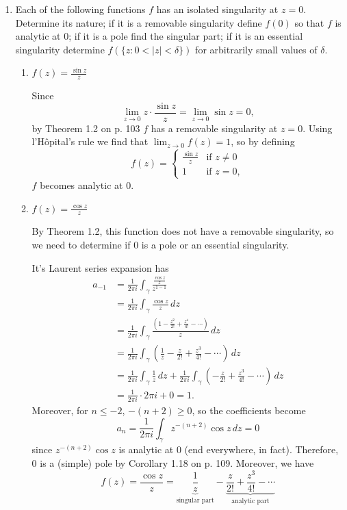 \documentclass[11pt,oneside,english]{amsart}
\theoremstyle{definition}
\newcommand{\lom}[2]{\lim_{{#1}\rightarrow{#2}}}
\begin{document}
\begin{enumerate}
\itemsep5mm

\item Each of the following functions $f$ has an isolated singularity at $z=0$. Determine its nature; if it is a removable singularity define $f(0)$ so that $f$ is analytic at 0; if it is a pole find the singular part; if it is an essential singularity determine $f(\{z:0<|z|<\delta\})$ for arbitrarily small values of $\delta$.

\begin{enumerate}
\itemsep5mm

\item $\displaystyle f(z)=\frac{\sin z}{z}$

Since 
\[
\lom{z}{0}z\cdot\frac{\sin z}{z}=\lom{z}{0}\sin z=0,
\]
by Theorem 1.2 on p. 103 $f$ has a removable singularity at $z=0$. Using l'H\^{o}pital's rule we find that $\lom{z}{0}f(z)=1$, so by defining
\[
f(z)=\begin{cases}\frac{\sin z}{z} & \text{if }z\neq0\\ 1 & \text{if }z=0,\end{cases}
\]
$f$ becomes analytic at 0.

\item $\displaystyle f(z)=\frac{\cos z}{z}$

By Theorem 1.2, this function does not have a removable singularity, so we need to determine if 0 is a pole or an essential singularity.

It's Laurent series expansion has
\begin{align*}
a_{-1}&=\frac{1}{2\pi i}\int_\gamma\frac{\frac{\cos z}{z}}{z^{1-1}}\\[2mm]
&=\frac{1}{2\pi i}\int_\gamma \frac{\cos z}{z}\,dz\\[2mm]
&=\frac{1}{2\pi i}\int_\gamma\frac{\left(1-\frac{z^2}{2!}+\frac{z^4}{4!}-\cdots\right)}{z}\,dz\\[2mm]
&=\frac{1}{2\pi i}\int_\gamma \left(\frac{1}{z}-\frac{z}{2!}+\frac{z^3}{4!}-\cdots\right)\,dz\\[2mm]
&=\frac{1}{2\pi i}\int_\gamma \frac{1}{z}\,dz+\frac{1}{2\pi i}\int_\gamma \left(-\frac{z}{2!}+\frac{z^3}{4!}-\cdots\right)\,dz\\[2mm]
&=\frac{1}{2\pi i}\cdot 2\pi i+0=1.
\end{align*}
Moreover, for $n\leq -2$, $-(n+2)\geq 0$, so the coefficients become
\[
a_{n}=\frac{1}{2\pi i}\int_\gamma z^{-(n+2)}\cos z\,dz=0
\]
since $z^{-(n+2)}\cos z$ is analytic at $0$ (end everywhere, in fact). Therefore, 0 is a (simple) pole by Corollary 1.18 on p. 109. Moreover, we have
\[
f(z)=\frac{\cos z}{z}=\underbrace{\frac{1}{z}}_{\text{singular part}}-\underbrace{\frac{z}{2!}+\frac{z^3}{4!}-\cdots}_{\text{analytic part}}
\]


\end{enumerate}
\end{enumerate}
\end{document}
